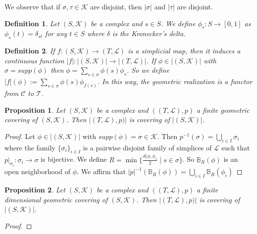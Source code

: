 \documentclass{amsart}
\newtheorem{proposition}{Proposition}[section]
\newtheorem{definition}{Definition}[section]
\begin{document}
We observe that if $\sigma, \tau\in\mathcal{K}$ are disjoint, then $\vert\sigma\vert$ and $\vert\tau\vert$ are disjoint.

\begin{definition}
Let $(S,\mathcal{K})$ be a complex and $s\in S$. We define $\phi_s\colon S\longrightarrow [0,1]$ as $\phi_s(t)=\delta_{st}$ for any $t\in S$ where $\delta$ is the Kronecker's delta.
\end{definition}

\begin{definition}
If $f\colon (S,\mathcal{K})\longrightarrow (T,\mathcal{L})$ is a simplicial map, then it induces a continuous function $\vert f\vert\colon \vert(S,\mathcal{K})\vert\longrightarrow \vert(T,\mathcal{L})\vert$. If $\phi\in \vert(S,\mathcal{K})\vert$ with $\sigma=supp(\phi)$ then $\phi=\sum_{s\in\sigma}\phi(s)\phi_s$. So  we define $\vert f\vert (\phi):=\sum_{s\in \sigma}\phi(s)\phi_{f(s)}$. In this way, the geometric realization is a functor from $\mathcal{C}$ to $\mathcal{T}$.
\end{definition}

\begin{proposition}
Let $(S,\mathcal{K})$ be a complex and $((T,\mathcal{L}),p)$ a finite geometric covering of $(S,\mathcal{K})$. Then $\vert (T,\mathcal{L}), p)\vert $ is covering of $\vert (S,\mathcal{K})\vert$.
\end{proposition}

\begin{proof}
Let $\phi\in \vert (S,\mathcal{K})\vert$ with $supp(\phi)=\sigma\in\mathcal{K}$. Then $p^{-1}(\sigma)=\bigcup_{i\in I}\sigma_i$ where the family $\{\sigma_i\}_{i\in I}$ is a pairwise disjoint family of simplices of $\mathcal{L}$ such that $p|_{\sigma_i}\colon \sigma_i\longrightarrow \sigma$ is bijective.  We define $R=\min\{\frac{d(\phi,\phi_s}{2}\mid s\in\sigma\}$. So $\mathbb{B}_R(\phi)$ is an open neighborhood of $\phi$. We affirm that $\vert p\vert^{-1}(\mathbb{B}_R(\phi))=\bigcup_{i\in I}\mathbb{B}_R(\phi_i)$
\end{proof}

\begin{proposition}
Let $(S,\mathcal{K})$ be a complex and $((T,\mathcal{L}),p)$ a finite dimensional geometric covering of $(S,\mathcal{K})$. Then $\vert (T,\mathcal{L}), p)\vert $ is covering of $\vert (S,\mathcal{K})\vert$.
\end{proposition}

\begin{proof}

\end{proof}
\end{document}
